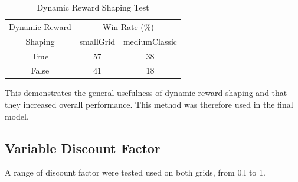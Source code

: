 \documentclass[letterpaper, 11pt, journal, final]{IEEEtran}
\begin{document}
\begin{table}[h!]
\centering
\caption{Dynamic Reward Shaping Test}
\begin{tabular}{c || c | c}
    \hline
    Dynamic Reward  & \multicolumn{2}{c}{Win Rate (\%)}\\
        \cline{2-3}
        Shaping & smallGrid & mediumClassic\\
    \hline
    \cellcolor{blue!18}True & \cellcolor{blue!18}57 & \cellcolor{blue!18}38 \\ [0.5ex]
    False & 41 & 18\\ [0.5ex]
    \hline
\end{tabular}
\end{table}


This demonstrates the general usefulness of dynamic reward shaping and that they increased overall performance. This method was therefore used in the final model.

\subsection{Variable Discount Factor}
A range of discount factor were tested used on both grids, from 0.l to 1.

\end{document}
